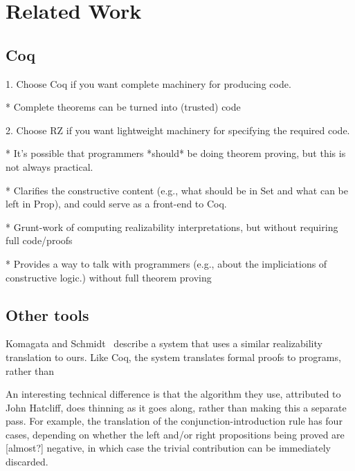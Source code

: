 \section{Related Work}
\subsection{Coq}
\label{sec:comparison-with-coq}


1. Choose Coq if you want complete machinery for producing code.

     * Complete theorems can be turned into (trusted) code

2. Choose RZ if you want lightweight machinery for specifying the required code.

     * It's possible that programmers *should* be doing theorem proving,
       but this is not always practical.

     * Clarifies the constructive content (e.g., what should be in Set
       and what can be left in Prop), and could serve as a front-end to
       Coq.

     * Grunt-work of computing realizability interpretations, but without
        requiring full code/proofs

     * Provides a way to talk with programmers (e.g., about the impliciations
       of constructive logic.) without full theorem proving


\subsection{Other tools}

Komagata and Schmidt~\cite{komagata+:tr95} describe a system that uses
a similar realizability translation to ours.  Like Coq, the system
translates formal proofs to programs, rather than 

An interesting technical difference is that the algorithm they use,
attributed to John Hatcliff, does thinning as it goes along, rather
than making this a separate pass.  For example, the translation of the
conjunction-introduction rule has four cases, depending on whether the
left and/or right propositions being proved are [almost?] negative, in which
case the trivial contribution can be immediately discarded.



